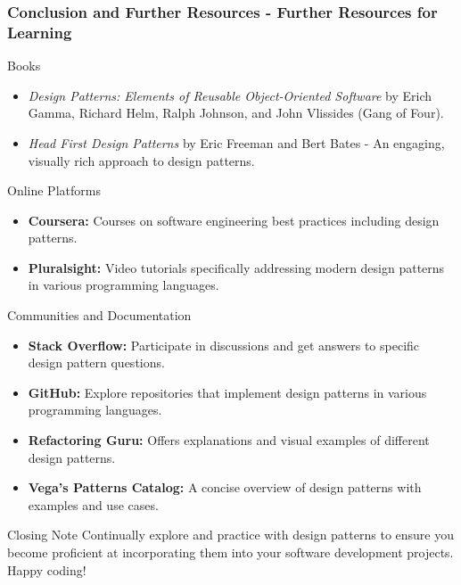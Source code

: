 \documentclass{beamer}
\begin{document}
\begin{frame}[fragile]
    \frametitle{Conclusion and Further Resources - Further Resources for Learning}

    \begin{block}{Books}
        \begin{itemize}
            \item \textit{Design Patterns: Elements of Reusable Object-Oriented Software} by Erich Gamma, Richard Helm, Ralph Johnson, and John Vlissides (Gang of Four).
            \item \textit{Head First Design Patterns} by Eric Freeman and Bert Bates - An engaging, visually rich approach to design patterns.
        \end{itemize}
    \end{block}

    \begin{block}{Online Platforms}
        \begin{itemize}
            \item \textbf{Coursera:} Courses on software engineering best practices including design patterns.
            \item \textbf{Pluralsight:} Video tutorials specifically addressing modern design patterns in various programming languages.
        \end{itemize}
    \end{block}

    \begin{block}{Communities and Documentation}
        \begin{itemize}
            \item \textbf{Stack Overflow:} Participate in discussions and get answers to specific design pattern questions.
            \item \textbf{GitHub:} Explore repositories that implement design patterns in various programming languages.
            \item \textbf{Refactoring Guru:} Offers explanations and visual examples of different design patterns.
            \item \textbf{Vega's Patterns Catalog:} A concise overview of design patterns with examples and use cases.
        \end{itemize}
    \end{block}

    \begin{block}{Closing Note}
        Continually explore and practice with design patterns to ensure you become proficient at incorporating them into your software development projects. Happy coding!
    \end{block}
\end{frame}
\end{document}
